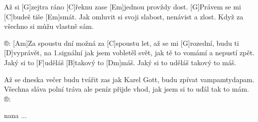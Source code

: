 
Až si [G]zejtra ráno [C]\null řeknu zase
[Em]jednou provždy dost.
[G]Právem se mi [C]budeš tiše [Em]smát.
Jak omluvit si svoji slabost, nenávist a zlost.
Když za všechno si můžu vlastně sám.

®: [Am]Za spoustu dní možná za [C]spoustu let,
až se mi [G]rozední, budu ti [D]vyprávět,
na 1.signální jak jsem vobletěl svět,
jak tě to vomámí a nepustí zpět.
Jaký si to [F]uděláš [B]takový to [Dm]máš.
Jaký si to uděláš takový to máš.

Až se dneska večer budu tvářit zas jak Karel Gott,
budu zpívat vampamtydapam.
Všechna sláva polní tráva ale peníz přijde vhod,
jak jsem si to uďál tak to mám. ®:

nana ...


